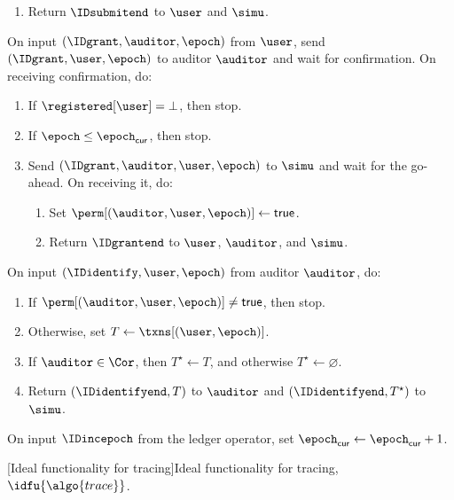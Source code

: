 \begin{framed}
\begin{enumerate}
	  \item Return $\IDsubmitend$ to $\user$ and $\simu$.

	\end{enumerate}

	\fuinterface{\IDgrant} On input $(\IDgrant, \auditor, \epoch)$ from $\user$, send
$(\IDgrant, \user, \epoch)$ to auditor $\auditor$ and wait for confirmation. On
receiving confirmation, do:

	\begin{enumerate}

	  \item If $\registered[\user] = \bot$, then stop.

	  \item If $\epoch \leq \epoch_{\mathsf{cur}}$, then stop.

	  \item Send $(\IDgrant, \auditor, \user, \epoch)$ to $\simu$ and wait
for the go-ahead. On receiving it, do:

	    \begin{enumerate}

	      \item Set $\perm[(\auditor,\user,\epoch)] \leftarrow
\mathsf{true}$.

	      \item Return $\IDgrantend$ to $\user$, $\auditor$, and $\simu$.

	    \end{enumerate}

	\end{enumerate}

	\fuinterface{\IDidentify} On input $(\IDidentify, \user, \epoch)$ from auditor
$\auditor$, do:

	\begin{enumerate}

	  \item If $\perm[(\auditor,\user,\epoch)] \neq \mathsf{true}$, then
stop.

	  \item Otherwise, set $T \leftarrow \txns[(\user,\epoch)]$.

	  \item If $\auditor \in \Cor$, then $T^\star \leftarrow T$, and otherwise
$T^\star \leftarrow \varnothing$.

	  \item Return $(\IDidentifyend, T)$ to $\auditor$ and $(\IDidentifyend,
T^\star)$ to $\simu$.

	\end{enumerate}

	\fuinterface{\IDincepoch} On input $\IDincepoch$ from the ledger operator,
set $\epoch_{\mathsf{cur}} \leftarrow \epoch_{\mathsf{cur}} + 1$.

    \end{framed}

[Ideal functionality for tracing]{Ideal functionality for tracing, $\idfu{\algo{trace}}$.}\label{fig:ftxid}
\endgroup
